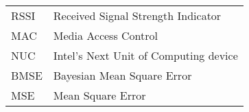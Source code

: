 \TAMUNomenclatureFormat

	\begin{table}[htbp]
	    \begin{tabular}{@{}p{} p{}@{}}
		RSSI  &  Received Signal Strength Indicator\\[2ex]
		MAC   &  Media Access Control\\[2ex]
		NUC	&	Intel's Next Unit of Computing device\\	[2ex]
		BMSE		&	Bayesian Mean Square Error\\	[2ex] %
		MSE			&	Mean Square Error\\	[2ex]
	    \end{tabular}%
	\end{table}



